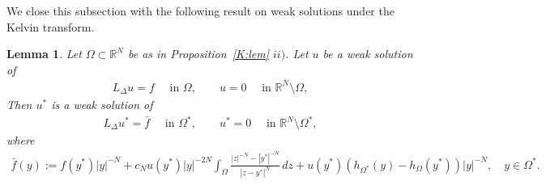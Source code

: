 \documentclass[11pt]{article}
\newcommand{\R}{\mathbb{R}}
\numberwithin{equation}{section}
\newtheorem{lemma}[theorem]{Lemma}
\begin{document}
We close this subsection with the following result on weak solutions under the Kelvin transform. 

\begin{lemma} \label{weak:lem}
Let $\Omega \subset \R^N$ be as in Proposition~\ref{K:lem} $ii)$.  Let $u$ be a weak solution of
\begin{align*}
    L_\Delta u = f\quad \text{ in }\Omega,\qquad u=0\quad \text{ in }\R^N \setminus \Omega,
\end{align*}
Then $u^*$ is a weak solution of
\begin{align*}
    L_\Delta u^* = \bar f\quad \text{ in }\Omega^*,\qquad u^*=0\quad \text{ in }\R^N \setminus \Omega^*,
\end{align*}
where
\begin{align*}
\bar f(y):=f(y^*)|y|^{-N}
+ c_N u(y^*) |y|^{-2N}\int_{\Omega}\frac{|z|^{-N}-|y^*|^{-N}}{|z-y^*|^N}\, dz + u(y^*)(h_{\Omega^*}(y)-h_\Omega(y^*))|y|^{-N},\quad y\in \Omega^*.
\end{align*}
\end{lemma}
\end{document}
